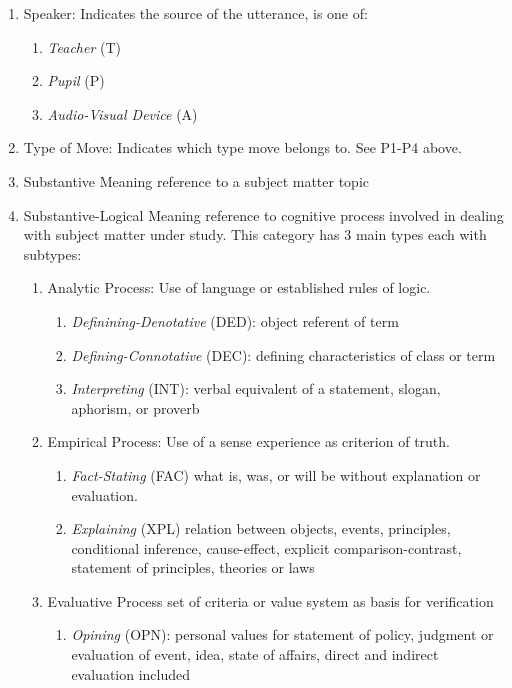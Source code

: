 \documentclass[conference]{IEEEtran}
\begin{document}
\begin{enumerate}
  \item{Speaker}: Indicates the source of the utterance, is one of:
  \begin{enumerate}
    \item \emph{Teacher} (T)
    \item \emph{Pupil} (P)
    \item \emph{Audio-Visual Device} (A)
  \end{enumerate}
  \item{Type of Move}: Indicates which type move belongs to. See P1-P4 above.
  \item {Substantive Meaning}  reference to a subject matter topic
  \item {Substantive-Logical Meaning}  reference to cognitive process involved
    in dealing with subject matter under study. This category has 3 main types each with subtypes:
  \begin{enumerate}
    \item Analytic Process: Use of language or established rules of logic.
    \begin{enumerate}
      \item \emph{Definining-Denotative} (DED): object referent of term
      \item \emph{Defining-Connotative} (DEC): defining characteristics of class or term
      \item \emph{Interpreting} (INT): verbal equivalent of a statement, slogan, aphorism, or proverb
      \end{enumerate}
    \item Empirical Process: Use of a sense experience as criterion of truth.
      \begin{enumerate}
      \item \emph{Fact-Stating} (FAC)  what is, was, or will be without explanation or evaluation.
      \item \emph{Explaining} (XPL)  relation between objects, events, principles, conditional inference, cause-effect, explicit comparison-contrast, statement of principles, theories or laws
      \end{enumerate}
    \item Evaluative Process  set of criteria or value system as basis for verification
      \begin{enumerate}
      \item \emph{Opining} (OPN): personal values for statement of policy, judgment or evaluation of event, idea, state of affairs, direct and indirect evaluation included

\end{enumerate}
\end{enumerate}
\end{enumerate}
\end{document}
